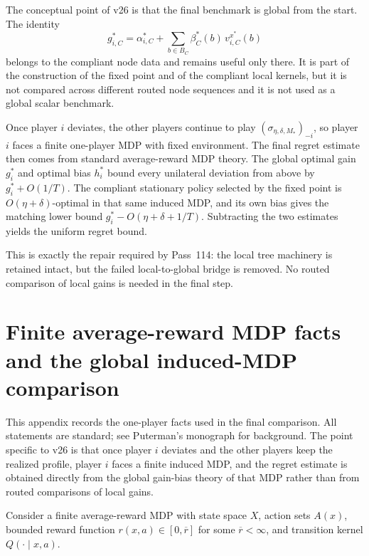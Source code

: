 \documentclass[12pt]{article}
\theoremstyle{definition}
\newcommand{\1}{\mathbf{1}}
\begin{document}
The conceptual point of v26 is that the final benchmark is global from the start.
The identity
\[
g_{i,C}^*
=
\alpha_{i,C}^*
+
\sum_{b\in B_C}\beta_C^*(b)\,v_{i,C}^{x^*}(b)
\]
belongs to the compliant node data and remains useful only there. It is part of
the construction of the fixed point and of the compliant local kernels, but it
is not compared across different routed node sequences and it is not used as a
global scalar benchmark.

Once player $i$ deviates, the other players continue to play
$(\sigma_{\eta,\delta,M_*})_{-i}$, so player $i$ faces a finite one-player MDP
with fixed environment. The final regret estimate then comes from standard
average-reward MDP theory. The global optimal gain $g_i^*$ and optimal bias
$h_i^*$ bound every unilateral deviation from above by
$g_i^*+O(1/T)$. The compliant stationary policy selected by the fixed point is
$O(\eta+\delta)$-optimal in that same induced MDP, and its own bias gives the
matching lower bound
$g_i^*-O(\eta+\delta+1/T)$. Subtracting the two estimates yields the uniform
regret bound.

This is exactly the repair required by Pass~114: the local tree machinery is
retained intact, but the failed local-to-global bridge is removed. No routed
comparison of local gains is needed in the final step.
\appendix




\section{Finite average-reward MDP facts and the global induced-MDP comparison}
\label{app:mdp}

This appendix records the one-player facts used in the final comparison.
All statements are standard; see Puterman's monograph \cite{Puterman1994} for
background. The point specific to v26 is that once player $i$ deviates and the
other players keep the realized profile, player $i$ faces a finite induced MDP,
and the regret estimate is obtained directly from the global gain-bias theory of
that MDP rather than from routed comparisons of local gains.

Consider a finite average-reward MDP with state space $X$, action sets $A(x)$,
bounded reward function $r(x,a)\in[0,\overline r]$ for some $\overline r<\infty$,
and transition kernel $Q(\cdot\mid x,a)$.
\end{document}
